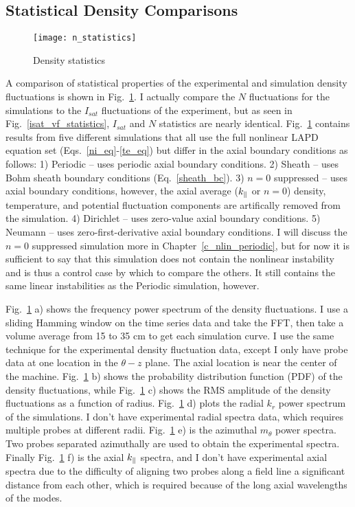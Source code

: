 \subsection{Statistical Density Comparisons}
\label{ss_stat_dens_comps}

\begin{figure}[!ht]
\centerline{\texttt{[image: n\_statistics]}}
\caption{Density statistics}
\label{n_statistics}
\end{figure}

A comparison of statistical properties of the experimental and simulation density fluctuations is shown in Fig.~\ref{n_statistics}. I actually compare the $N$ fluctuations for the simulations
to the $I_{sat}$ fluctuations of the experiment, but as seen in Fig.~\ref{isat_vf_statistics}, $I_{sat}$ and $N$ statistics are nearly identical.
Fig.~\ref{n_statistics} contains results from five different simulations
that all use the full nonlinear LAPD equation set (Eqs.~\ref{ni_eq}-\ref{te_eq}) but differ in the axial boundary conditions as follows:
1) Periodic -- uses periodic axial boundary conditions. 2) Sheath -- uses Bohm sheath boundary conditions (Eq.~\ref{sheath_bc}). 3) $n=0$ suppressed -- uses axial boundary conditions,
however, the axial average ($k_\parallel$ or $n = 0$) density, temperature, and potential fluctuation components are artifically removed from the simulation. 4) Dirichlet -- uses zero-value axial
boundary conditions. 5) Neumann -- uses zero-first-derivative axial boundary conditions. I will discuss the $n=0$ suppressed simulation more in Chapter~\ref{c_nlin_periodic}, but for
now it is sufficient to say that this simulation does not contain the nonlinear instability and is thus a control case by which to compare the others. It still contains the same
linear instabilities as the Periodic simulation, however.

Fig.~\ref{n_statistics} a) shows the frequency power spectrum of the density fluctuations. I use a sliding Hamming window on the time series data and take the FFT, then take a volume
average from 15 to 35 cm to get each simulation curve. I use the same technique for the experimental density fluctuation data, except I only have probe data at one location in the
$\theta-z$ plane. The axial location is near the center of the machine. Fig.~\ref{n_statistics} b) shows the probability distribution function (PDF) of the density fluctuations,
while Fig.~\ref{n_statistics} c) shows the RMS amplitude of the density fluctuations as a function of radius. Fig.~\ref{n_statistics} d) plots the radial $k_r$ power spectrum of the simulations.
I don't have experimental radial spectra data, which requires multiple probes at different radii. Fig.~\ref{n_statistics} e) is the azimuthal $m_\theta$ power spectra. 
Two probes separated azimuthally are used to obtain the experimental spectra. Finally Fig.~\ref{n_statistics} f) is the axial $k_\parallel$ spectra, and I don't have experimental axial spectra due
to the difficulty of aligning two probes along a field line a significant distance from each other, which is required because of the long axial wavelengths of the modes.

